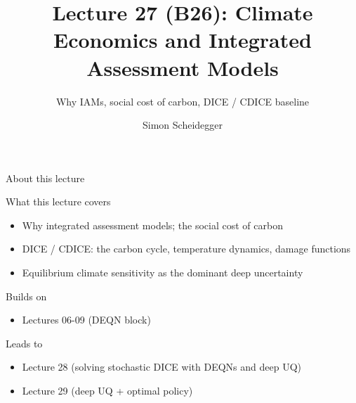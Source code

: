 \documentclass[aspectratio=169,11pt]{beamer}
\title[Lecture 27 (B26)]{Lecture 27 (B26): Climate Economics and Integrated Assessment Models}
\subtitle{Why IAMs, social cost of carbon, DICE / CDICE baseline}
\author{Simon Scheidegger}
\institute{HEC, University of Lausanne}
\date{}
\begin{document}
\providecommand{\exercisepause}{%
  \tikz[baseline=(X.base)]{\node[fill=darkgreen!80!black, text=white,
  rounded corners=2pt, inner sep=3pt, font=\scriptsize\bfseries](X){PAUSE};}}

{
\begin{frame}
\titlepage
\end{frame}
}

\begin{frame}{About this lecture}
\small
\begin{block}{What this lecture covers}
\begin{itemize}\itemsep2pt
  \item Why integrated assessment models; the social cost of carbon
  \item DICE / CDICE: the carbon cycle, temperature dynamics, damage functions
  \item Equilibrium climate sensitivity as the dominant deep uncertainty
\end{itemize}
\end{block}
\begin{block}{Builds on}
\begin{itemize}\itemsep2pt
  \item Lectures 06-09 (DEQN block)
\end{itemize}
\end{block}
\begin{block}{Leads to}
\begin{itemize}\itemsep2pt
  \item Lecture 28 (solving stochastic DICE with DEQNs and deep UQ)
  \item Lecture 29 (deep UQ + optimal policy)
\end{itemize}
\end{block}
\end{frame}
\end{document}
